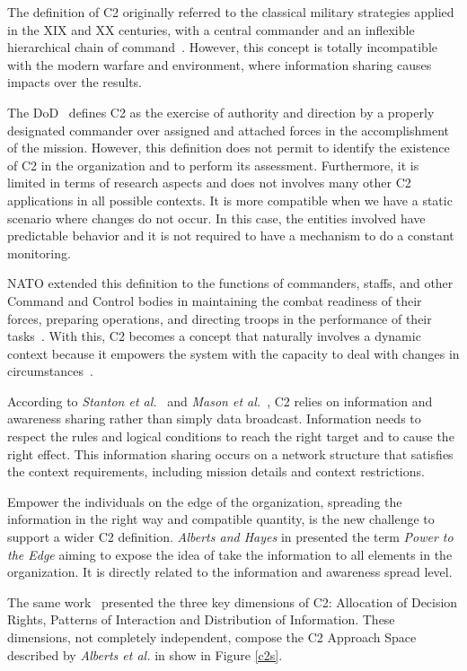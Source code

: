 The definition of C2 originally referred to the classical military strategies applied in the XIX and XX centuries, with a central commander and an inflexible hierarchical chain of command~\cite{Alberts2006}. However, this concept is totally incompatible with the modern warfare and environment, where information sharing causes impacts over the results.

The \gls{DoD}~\cite{dod01} defines C2 as the exercise of authority and direction by a properly designated commander over assigned and attached forces in the accomplishment of the mission. However, this definition does not permit to identify the existence of C2 in the organization and to perform its assessment. Furthermore, it is limited in terms of research aspects and does not involves many other C2 applications in all possible contexts. It is more compatible when we have a static scenario where changes do not occur. In this case, the entities involved have predictable behavior and it is not required to have a mechanism to do a constant monitoring. 

NATO extended this definition to the functions of commanders, staffs, and other Command and Control bodies in maintaining the combat readiness of their forces, preparing operations, and directing troops in the performance of their tasks~\cite{FRANCE2014}. With this, C2 becomes a concept that naturally involves a dynamic context because it empowers the system with the capacity to deal with changes in circumstances~\cite{Power01}.

According to \textit{Stanton et al.}~\cite{Stanton2007} and \textit{Mason et al.}~\cite{Mason2001}, C2 relies on information and awareness sharing rather than simply data broadcast. Information needs to respect the rules and logical conditions to reach the right target and to cause the right effect. This information sharing occurs on a network structure that satisfies the context requirements, including mission details and context restrictions. 

Empower the individuals on the edge of the organization, spreading the information in the right way and compatible quantity, is the new challenge to support a wider C2 definition. \textit{Alberts and Hayes} in \cite{Power01} presented the term \textit{Power to the Edge} aiming to expose the idea of take the information to all elements in the organization. It is directly related to the information and awareness spread level.

The same work~\cite{Power01} presented the three key dimensions of C2: Allocation of Decision Rights, Patterns of Interaction and Distribution of Information. These dimensions, not completely independent, compose the C2 Approach Space described by \textit{Alberts et al.} in \cite{Alberts2006} show in Figure \ref{c2s}.

